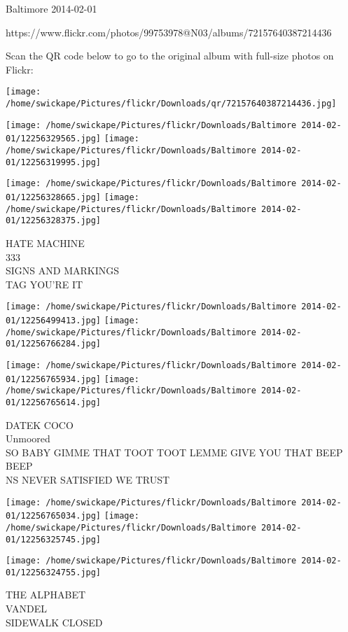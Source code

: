 \documentclass[10pt,letterpaper]{article}
\begin{document}
Baltimore 2014-02-01

https://www.flickr.com/photos/99753978@N03/albums/72157640387214436

Scan the QR code below to go to the original album with full-size photos on Flickr:

\texttt{[image: /home/swickape/Pictures/flickr/Downloads/qr/72157640387214436.jpg]}
\pagebreak

\texttt{[image: /home/swickape/Pictures/flickr/Downloads/Baltimore 2014-02-01/12256329565.jpg]}
\texttt{[image: /home/swickape/Pictures/flickr/Downloads/Baltimore 2014-02-01/12256319995.jpg]}

\texttt{[image: /home/swickape/Pictures/flickr/Downloads/Baltimore 2014-02-01/12256328665.jpg]}
\texttt{[image: /home/swickape/Pictures/flickr/Downloads/Baltimore 2014-02-01/12256328375.jpg]}

HATE MACHINE\\
333\\
SIGNS AND MARKINGS\\
TAG YOU'RE IT
\pagebreak

\texttt{[image: /home/swickape/Pictures/flickr/Downloads/Baltimore 2014-02-01/12256499413.jpg]}
\texttt{[image: /home/swickape/Pictures/flickr/Downloads/Baltimore 2014-02-01/12256766284.jpg]}

\texttt{[image: /home/swickape/Pictures/flickr/Downloads/Baltimore 2014-02-01/12256765934.jpg]}
\texttt{[image: /home/swickape/Pictures/flickr/Downloads/Baltimore 2014-02-01/12256765614.jpg]}

DATEK COCO\\
Unmoored\\
SO BABY GIMME THAT TOOT TOOT LEMME GIVE YOU THAT BEEP BEEP\\
NS NEVER SATISFIED WE TRUST
\pagebreak

\texttt{[image: /home/swickape/Pictures/flickr/Downloads/Baltimore 2014-02-01/12256765034.jpg]}
\texttt{[image: /home/swickape/Pictures/flickr/Downloads/Baltimore 2014-02-01/12256325745.jpg]}

\vspace{0.25in}
\texttt{[image: /home/swickape/Pictures/flickr/Downloads/Baltimore 2014-02-01/12256324755.jpg]}

THE ALPHABET\\
VANDEL\\
SIDEWALK CLOSED
\pagebreak
\end{document}
